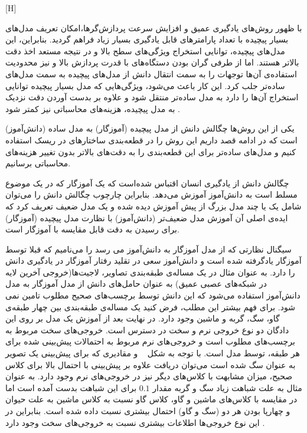 [H]


با ظهور روش‌های یادگیری عمیق و افزایش سرعت پردازش‌گرها،امکان تعریف مدل‌های بسیار پیچیده با تعداد پارامترهای قابل یادگیری بسیار زیاد فراهم گردید. بنابراین، این مدل‌های پیچیده، توانایی استخراج ویژگی‌های سطح بالا و در نتیجه مستعد اخذ دقت بالاتر هستند. اما از طرفی گران بودن دستگاه‌های با قدرت پردازش‌ بالا و نیز محدودیت استفاده‌ی آن‌ها توجهات را به سمت انتقال دانش از مدل‌های پیچیده به سمت مدل‌های ساده‌تر جلب کرد. این کار باعث می‌شود، ویژگی‌هایی که مدل بسیار پیچیده توانایی استخراج‌ آن‌ها را دارد به مدل ساده‌تر منتقل شود و علاوه بر بدست آوردن دقت نزدیک به مدل پیچیده، هزینه‌های محاسباتی نیز کمتر شود .

یکی از این روش‌ها چگالش دانش از مدل پیچیده (آموزگار) به مدل ساده (دانش‌آموز) است که در ادامه قصد داریم این روش را در قطعه‌بندی ساختارهای در ریسک استفاده کنیم و مدل‌های ساده‌تر برای این قطعه‌بندی را به دقت‌های بالاتر بدون تغییر هزینه‌های محاسباتی برسانیم.


چگالش دانش از یادگیری انسان اقتباس شده‌است که یک آموزگار که در یک موضوع مسلط است به دانش‌آموز آموزش می‌دهد. بنابراین چارچوب چگالش دانش را می‌توان شامل یک یا چند مدل بزرگ از پیش آموزش دیده شده و یک مدل ضعیف تعریف کرد که ایده‌ی اصلی آن آموزش مدل ضعیف‌تر (دانش‌آموز) با نظارت مدل پیچیده (آموزگار) برای رسیدن به دقت قابل مقایسه با آموزگار است.

سیگنال نظارتی که از مدل آموزگار به دانش‌آموز می رسد را	  می‌نامیم که قبلا توسط آموزگار یادگرفته شده است و دانش‌آموز سعی در تقلید رفتار آموزگار در یادگیری دانش را دارد. به عنوان مثال در یک مساله‌ی طبقه‌بندی تصاویر، لاجیت‌ها(خروجی آخرین لایه در شبکه‌های عصبی عمیق) به عنوان حامل‌های دانش از مدل آموزگار به مدل دانش‌آموز استفاده می‌شود که این دانش توسط برچسب‌های صحیح مطلوب تامین نمی شود. برای فهم بیشتر این مطلب، فرض کنید یک مساله‌ی طبقه‌بندی بین چهار طبقه‌ی گاو، سگ، گربه و ماشین وجود دارد. در نهایت بعد از آموزش یک مدل بر روی این دادگان دو نوع خروجی نرم و سخت در دسترس است. خروجی‌های سخت مربوط به برچسب‌های مطلوب است و خروجی‌های نرم مربوط به احتمالات پیش‌بینی شده برای هر طبقه، توسط مدل است. با توجه به شکل ~ و مقادیری که برای پیش‌بینی یک تصویر به عنوان سگ شده است می‌توان دریافت علاوه بر پیش‌بینی با احتمال بالا برای کلاس صحیح، میزان مشابهت با کلاس‌های دیگر نیز در خروجی‌های نرم وجود دارد. به عنوان مثال به علت شباهت زیاد سگ و گربه مقدار $0.1$ برای این شباهت بدست آمده است اما در مقایسه با کلاس‌های ماشین و گاو، کلاس گاو نسبت به کلاس ماشین به علت حیوان و چهارپا بودن هر دو (سگ و گاو) احتمال بیشتری نسبت داده شده است. بنابراین در این نوع خروجی‌ها اطلاعات بیشتری نسبت به خروجی‌های سخت وجود دارد .

